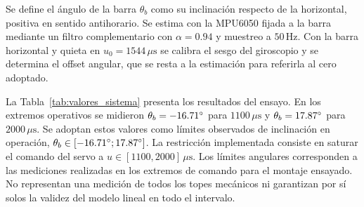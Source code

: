 \documentclass[a4paper, twoside, 10pt, spanish]{article}
\numberwithin{table}{section}
\begin{document}
    Se define el ángulo de la barra $\theta_b$ como su inclinación respecto de la horizontal, positiva en sentido antihorario. Se estima con la MPU6050 fijada a la barra mediante un filtro complementario con $\alpha=0.94$ y muestreo a $50\,\text{Hz}$. Con la barra horizontal y quieta en $u_0=1544\,\mu\text{s}$ se calibra el sesgo del giroscopio y se determina el offset angular, que se resta a la estimación para referirla al cero adoptado.

    La Tabla~\ref{tab:valores_sistema} presenta los resultados del ensayo. En los extremos operativos se midieron $\theta_b=-16.71\degree$ para $1100\,\mu\text{s}$ y $\theta_b=17.87\degree$ para $2000\,\mu\text{s}$. Se adoptan estos valores como límites observados de inclinación en operación, $\theta_b\in[-16.71\degree; 17.87\degree]$. La restricción implementada consiste en saturar el comando del servo a $u\in[1100,2000]\,\mu\text{s}$. Los límites angulares corresponden a las mediciones realizadas en los extremos de comando para el montaje ensayado. No representan una medición de todos los topes mecánicos ni garantizan por sí solos la validez del modelo lineal en todo el intervalo.
\end{document}
